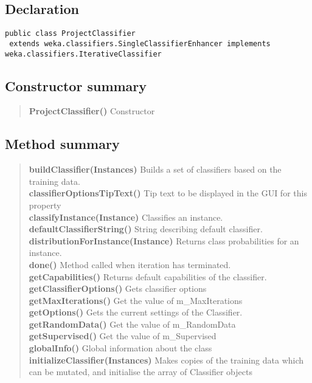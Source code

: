 \documentclass[11pt,a4paper]{report}
\begin{document}
{{{\subsection{Declaration}{
\begin{lstlisting}[frame=none]
public class ProjectClassifier
 extends weka.classifiers.SingleClassifierEnhancer implements weka.classifiers.IterativeClassifier\end{lstlisting}
\subsection{Constructor summary}{
\begin{verse}
{\bf ProjectClassifier()} Constructor\\
\end{verse}
}
\subsection{Method summary}{
\begin{verse}
{\bf buildClassifier(Instances)} Builds a set of classifiers based on the training data.\\
{\bf classifierOptionsTipText()} Tip text to be displayed in the GUI for this property\\
{\bf classifyInstance(Instance)} Classifies an instance.\\
{\bf defaultClassifierString()} String describing default classifier.\\
{\bf distributionForInstance(Instance)} Returns class probabilities for an instance.\\
{\bf done()} Method called when iteration has terminated.\\
{\bf getCapabilities()} Returns default capabilities of the classifier.\\
{\bf getClassifierOptions()} Gets classifier options\\
{\bf getMaxIterations()} Get the value of m\_MaxIterations\\
{\bf getOptions()} Gets the current settings of the Classifier.\\
{\bf getRandomData()} Get the value of m\_RandomData\\
{\bf getSupervised()} Get the value of m\_Supervised\\
{\bf globalInfo()} Global information about the class\\
{\bf initializeClassifier(Instances)} Makes copies of the training data which can be mutated, and initialise the array of Classifier objects\\

\end{verse}}}}}}
\end{document}
